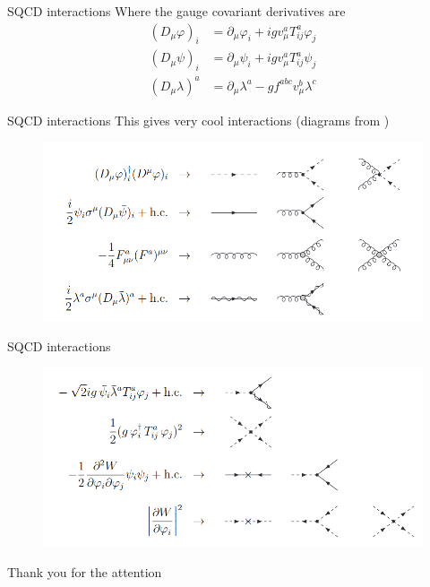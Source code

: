 \documentclass[10pt]{beamer}
\begin{document}
\begin{frame}{SQCD interactions}
    Where the gauge covariant derivatives are
    \begin{equation*}\begin{aligned}
        \left(D_{\mu} \varphi\right)_{i} &=\partial_{\mu} \varphi_{i}+i g v_{\mu}^{a} T_{i j}^{a} \varphi_{j} \\
        \left(D_{\mu} \psi\right)_{i} &=\partial_{\mu} \psi_{i}+i g v_{\mu}^{a} T_{i j}^{a} \psi_{j} \\
        \left(D_{\mu} \lambda\right)^{a} &=\partial_{\mu} \lambda^{a}-g f^{a b c} v_{\mu}^{b} \lambda^{c}
        \end{aligned}
    \end{equation*}
\end{frame}

\begin{frame}{SQCD interactions}
    This gives very cool interactions (diagrams from \cite{Signer_2009})
    \begin{figure}
        \centering 
        \includegraphics[scale=0.35]{sqcd_inter_2.png}
    \end{figure}
\end{frame}

\begin{frame}{SQCD interactions}
    \begin{figure}
        \centering 
        \includegraphics[scale=0.35]{sqcd_inter_1.png}
    \end{figure}
\end{frame}


{
\begin{frame}
    \vfill
    \centerline{Thank you for the attention}
    \vfill
\end{frame}
}

\begin{frame}
    \nocite{*}
    \printbibliography
\end{frame}
\end{document}
